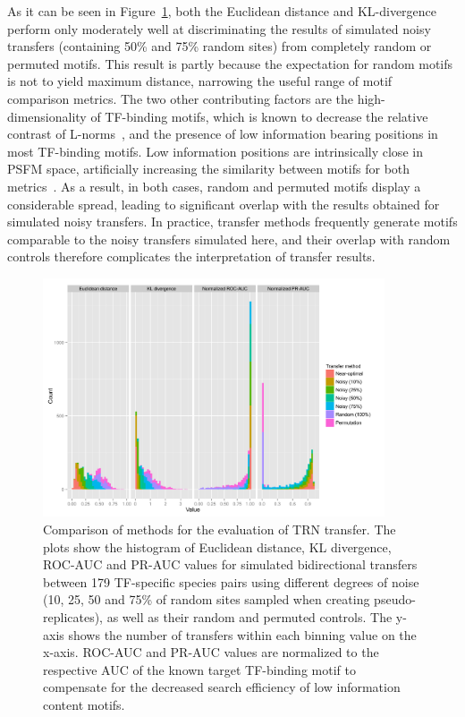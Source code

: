 As it can be seen in Figure~\ref{fig:transfer-evaluation-comparison}, both the
Euclidean distance and KL-divergence perform only moderately well at
discriminating the results of simulated noisy transfers (containing 50\% and
75\% random sites) from completely random or permuted motifs. This result is
partly because the expectation for random motifs is not to yield maximum
distance, narrowing the useful range of motif comparison metrics. The two other
contributing factors are the high-dimensionality of TF-binding motifs, which is
known to decrease the relative contrast of
L-norms~\cite{aggarwal2001surprising}, and the presence of low information
bearing positions in most TF-binding motifs. Low information positions are
intrinsically close in PSFM space, artificially increasing the similarity
between motifs for both metrics~\cite{zhang2013spic}. As a result, in both
cases, random and permuted motifs display a considerable spread, leading to
significant overlap with the results obtained for simulated noisy transfers. In
practice, transfer methods frequently generate motifs comparable to the noisy
transfers simulated here, and their overlap with random controls therefore
complicates the interpretation of transfer results.

\begin{figure}
  \centering
  \includegraphics[width=0.9\textwidth]{figures/chapter3/transfer-evaluation-comparison}
  \caption{Comparison of methods for the evaluation of TRN transfer. The plots
    show the histogram of Euclidean distance, KL divergence, ROC-AUC and PR-AUC
    values for simulated bidirectional transfers between 179 TF-specific
    species pairs using different degrees of noise (10, 25, 50 and 75\% of
    random sites sampled when creating pseudo-replicates), as well as their
    random and permuted controls. The y-axis shows the number of transfers
    within each binning value on the x-axis. ROC-AUC and PR-AUC values are
    normalized to the respective AUC of the known target TF-binding motif to
    compensate for the decreased search efficiency of low information content
    motifs.}
\label{fig:transfer-evaluation-comparison}
\end{figure}

